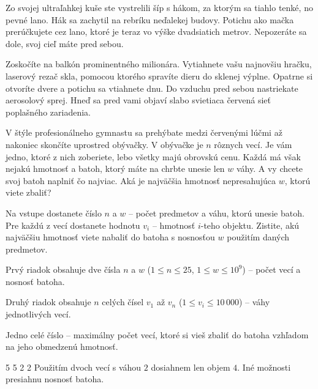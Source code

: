 





Zo svojej ultraľahkej kuše ste vystrelili šíp s hákom, za ktorým sa tiahlo tenké, no pevné lano. Hák
sa zachytil na rebríku neďalekej budovy. Potichu ako mačka prerúčkujete cez lano, ktoré je teraz
vo výške dvadsiatich metrov. Nepozeráte sa dole, svoj cieľ máte pred sebou.

Zoskočíte na balkón prominentného milionára. Vytiahnete vašu najnovšiu hračku, laserový rezač skla,
pomocou ktorého spravíte dieru do sklenej výplne. Opatrne si otvoríte dvere a potichu sa vtiahnete
dnu. Do vzduchu pred sebou nastriekate aerosolový sprej. Hneď sa pred vami objaví slabo svietiaca
červená sieť poplašného zariadenia.

V štýle profesionálneho gymnastu sa prehýbate medzi červenými lúčmi až nakoniec skončíte uprostred
obývačky. V obývačke je $n$ rôznych vecí. Je vám jedno, ktoré z nich zoberiete, lebo všetky majú
obrovskú cenu. Každá má však nejakú hmotnosť a batoh, ktorý máte na chrbte unesie len $w$ váhy. A vy
chcete svoj batoh naplniť čo najviac. Aká je najväčšia hmotnosť nepresahujúca $w$, ktorú viete zbaliť?


Na vstupe dostanete číslo $n$ a $w$ -- počet predmetov a váhu, ktorú unesie batoh. Pre každú z vecí
dostanete hodnotu $v_i$ -- hmotnosť $i$-teho objektu. Zistite, akú najväčšiu hmotnosť viete nabaliť
do batoha s nosnosťou $w$ použitím daných predmetov.


Prvý riadok obsahuje dve čísla $n$ a $w$ ($1 \leq n \leq 25$, $1\leq w \leq 10^9$) -- počet vecí a
nosnosť batoha.

Druhý riadok obsahuje $n$ celých čísel $v_1$ až $v_n$ ($1 \leq v_i \leq 10\,000 $) -- váhy
jednotlivých vecí.


Jedno celé číslo -- maximálny počet vecí, ktoré si vieš zbaliť do batoha vzhľadom na jeho obmedzenú
hmotnosť.


 5
5 2 2
\komentar
Použitím dvoch vecí s váhou $2$ dosiahnem len objem $4$. Iné možnosti presiahnu nosnosť batoha.
\koniec


